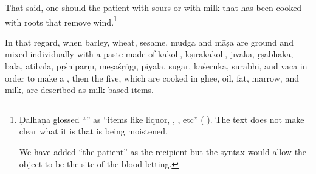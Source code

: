 \begin{translation}
That said, one should  the patient with sours
or with milk that has been cooked with roots that remove
wind.\footnote{Ḍalhaṇa glossed “” as “items like
    liquor, , , etc”
    ( ).  The text
    does not make clear what it is that is being moistened.

We have added “the patient” as the recipient but the syntax would
allow the object to be the site of the blood letting.}





In that regard,
when
barley,
wheat, sesame,
\gls{mudga} and
\gls{māṣa} are ground and mixed individually
with a paste made of
%
\gls{kākolī},
\gls{kṣīrakākolī},
\gls{jīvaka},
\gls{ṛṣabhaka},
\gls{balā},
\gls{atibalā},
\gls{pṛśniparṇī},
\gls{meṣaśṛṅgī},
\gls{piyāla},
sugar,
\gls{kaśerukā},
\gls{surabhi}, and
\gls{vacā}
in order to make a ,
then the five, which are cooked in ghee, oil, fat,
marrow,
and milk, are described as milk-based items.





\end{translation}
